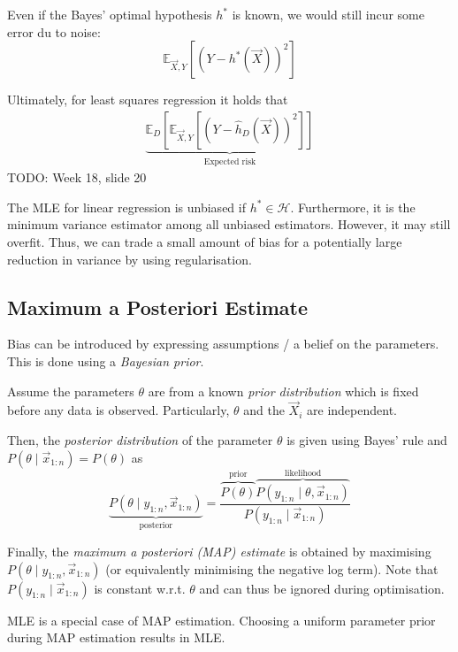 Even if the Bayes' optimal hypothesis $h^*$ is
known, we would still incur some error du to noise:
\begin{equation*}
    \mathbb{E}_{\vec{X}, Y}[
        (Y - h^*(\vec{X}))^2
    ]
\end{equation*}

Ultimately, for least squares regression it holds that
\begin{align*}
    \underbrace{\mathbb{E}_D[\mathbb{E}_{\vec{X}, Y}[
        (Y - \hat{h}_D(\vec{X}))^2
    ]]}_{\text{Expected risk}}
\end{align*}
TODO: Week 18, slide 20

The MLE for linear regression is unbiased
if $h^* \in \mathcal{H}$.
Furthermore, it is the minimum variance
estimator among all unbiased estimators.
However, it may still overfit.
Thus, we can trade a small amount of bias
for a potentially large reduction in variance
by using regularisation.


\subsection{Maximum a Posteriori Estimate}
Bias can be introduced by expressing assumptions / a belief
on the parameters.
This is done using a \emph{Bayesian prior}.

Assume the parameters $\theta$ are from a known
\emph{prior distribution} which is fixed before any data
is observed.
Particularly, $\theta$ and the $\vec{X}_i$ are independent.

Then, the \emph{posterior distribution} of the parameter
$\theta$ is given using Bayes' rule
and $P(\theta \mid \vec{x}_{1:n}) = P(\theta)$ as
\begin{equation*}
    \underbrace{
        P(\theta \mid y_{1:n}, \vec{x}_{1:n})}_\text{posterior}
    = \frac{
        \overbrace{P(\theta)}^\text{prior}
        \overbrace{
        P(y_{1:n} \mid \theta, \vec{x}_{1:n})}^\text{likelihood}
    }{
        P(y_{1:n} \mid \vec{x}_{1:n})
    }
\end{equation*}

Finally, the \emph{maximum a posteriori (MAP) estimate}
is obtained by maximising $P(\theta \mid y_{1:n}, \vec{x}_{1:n})$
(or equivalently minimising the negative log term).
Note that $P(y_{1:n} \mid \vec{x}_{1:n})$ is constant w.r.t.
$\theta$ and can thus be ignored during optimisation.

MLE is a special case of MAP estimation.
Choosing a uniform parameter prior during
MAP estimation results in MLE.



